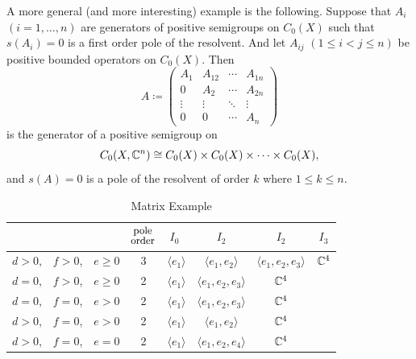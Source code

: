 A more general (and more interesting) example is the following.
Suppose that $A_{i}$ $(i = 1,\ldots,n)$ are generators of positive semigroups on $C_{0}(X)$ such that $s(A_{i}) = 0$ is a first order pole of the resolvent.
And let $A_{ij}$ $(1 \leq i < j \leq n)$ be positive bounded operators on $C_{0}(X)$.
Then
\[
A \coloneq \begin{pmatrix}
	A_{1} & A_{12} & \cdots & A_{1n} \\
	0 & A_{2} & \cdots & A_{2n} \\
	\vdots & \vdots & \ddots & \vdots \\
	0 & 0 & \cdots & A_{n}
\end{pmatrix}
\]
is the generator of a positive semigroup on 
%
\[
	C_{0}(X,\mathbb{C}^{n}) \cong C_{0}(X) \times C_{0}(X) \times \cdots \times C_{0}(X) , 
\]
%
and $s(A) = 0$ is a pole of the resolvent of order $k$ where $1 \leq k \leq n$.
\begin{table}[ht!]
\centering
\caption{Matrix Example}\label{tab:b3-table1}
\begin{tabular}{p{10mm}p{10mm}p{10mm}|c|p{8mm}ccc}
  &&& $\overset{\text{\small pole}}{\text{\small order}}$
      & $\ I_0$ & $I_2$ & $I_2$ & $I_3$ \\[1ex]\hline
  $d>0$, & $f>0$, & $e\geq 0$ & 3
      & $\langle e_1\rangle$ & $\langle e_1,e_2\rangle$
      & $\langle e_1,e_2,e_3\rangle$ & $\mathbb{C}^4$ \\
  $d=0$, & $f>0$, & $e\geq 0$ & 2
      & $\langle e_1\rangle$ & $\langle e_1,e_2,e_3\rangle$
      & $\mathbb{C}^4$ & \\
  $d=0$, & $f=0$, & $e>0$    & 2
      & $\langle e_1\rangle$ & $\langle e_1,e_2,e_3\rangle$
      & $\mathbb{C}^4$ & \\
  $d>0$, & $f=0$, & $e>0$    & 2
      & $\langle e_1\rangle$ & $\langle e_1,e_2\rangle$
      & $\mathbb{C}^4$ & \\
  $d>0$, & $f=0$, & $e=0$    & 2
      & $\langle e_1\rangle$ & $\langle e_1,e_2,e_4\rangle$
      & $\mathbb{C}^4$ & \\
\end{tabular}
\end{table}
